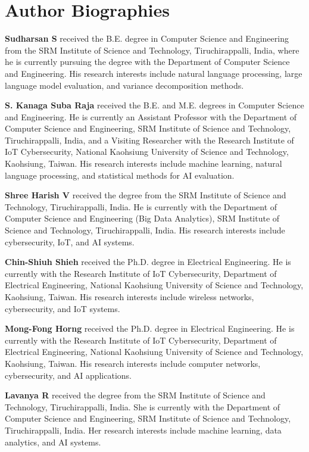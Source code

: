 \documentclass[11pt]{article}
\theoremstyle{definition}
\theoremstyle{plain}
\begin{document}
\section*{Author Biographies}

\noindent\textbf{Sudharsan S} received the B.E. degree in Computer Science and Engineering from the SRM Institute of Science and Technology, Tiruchirappalli, India, where he is currently pursuing the degree with the Department of Computer Science and Engineering. His research interests include natural language processing, large language model evaluation, and variance decomposition methods.

\noindent\textbf{S. Kanaga Suba Raja} received the B.E. and M.E. degrees in Computer Science and Engineering. He is currently an Assistant Professor with the Department of Computer Science and Engineering, SRM Institute of Science and Technology, Tiruchirappalli, India, and a Visiting Researcher with the Research Institute of IoT Cybersecurity, National Kaohsiung University of Science and Technology, Kaohsiung, Taiwan. His research interests include machine learning, natural language processing, and statistical methods for AI evaluation.

\noindent\textbf{Shree Harish V} received the degree from the SRM Institute of Science and Technology, Tiruchirappalli, India. He is currently with the Department of Computer Science and Engineering (Big Data Analytics), SRM Institute of Science and Technology, Tiruchirappalli, India. His research interests include cybersecurity, IoT, and AI systems.

\noindent\textbf{Chin-Shiuh Shieh} received the Ph.D. degree in Electrical Engineering. He is currently with the Research Institute of IoT Cybersecurity, Department of Electrical Engineering, National Kaohsiung University of Science and Technology, Kaohsiung, Taiwan. His research interests include wireless networks, cybersecurity, and IoT systems.

\noindent\textbf{Mong-Fong Horng} received the Ph.D. degree in Electrical Engineering. He is currently with the Research Institute of IoT Cybersecurity, Department of Electrical Engineering, National Kaohsiung University of Science and Technology, Kaohsiung, Taiwan. His research interests include computer networks, cybersecurity, and AI applications.

\noindent\textbf{Lavanya R} received the degree from the SRM Institute of Science and Technology, Tiruchirappalli, India. She is currently with the Department of Computer Science and Engineering, SRM Institute of Science and Technology, Tiruchirappalli, India. Her research interests include machine learning, data analytics, and AI systems.
\end{document}

